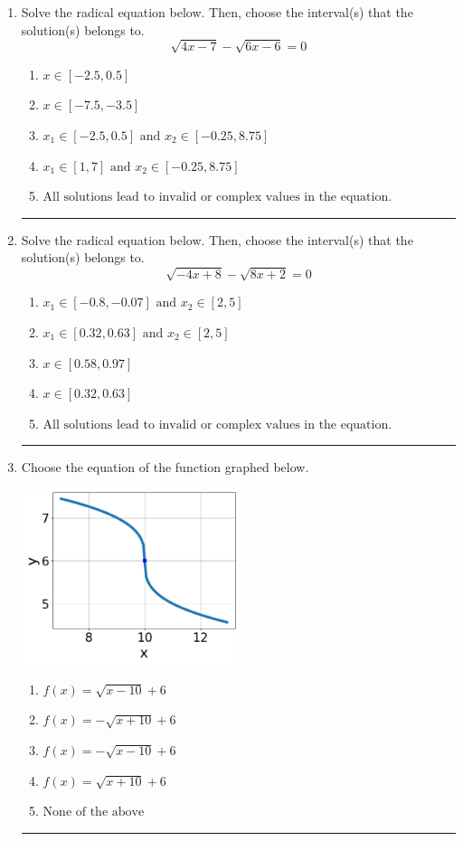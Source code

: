 \documentclass[14pt]{extbook}
\newcommand{\litem}[1]{\item#1\hspace*{-1cm}\rule{\textwidth}{0.4pt}}
\begin{document}
\begin{enumerate}
{\begin{enumerate}[label=\Alph*.]
\end{enumerate} }
\litem{
Solve the radical equation below. Then, choose the interval(s) that the solution(s) belongs to.\[ \sqrt{4 x - 7} - \sqrt{6 x - 6} = 0 \]\begin{enumerate}[label=\Alph*.]
\item \( x \in [-2.5,0.5] \)
\item \( x \in [-7.5,-3.5] \)
\item \( x_1 \in [-2.5, 0.5] \text{ and } x_2 \in [-0.25,8.75] \)
\item \( x_1 \in [1, 7] \text{ and } x_2 \in [-0.25,8.75] \)
\item \( \text{All solutions lead to invalid or complex values in the equation.} \)

\end{enumerate} }
\litem{
Solve the radical equation below. Then, choose the interval(s) that the solution(s) belongs to.\[ \sqrt{-4 x + 8} - \sqrt{8 x + 2} = 0 \]\begin{enumerate}[label=\Alph*.]
\item \( x_1 \in [-0.8, -0.07] \text{ and } x_2 \in [2,5] \)
\item \( x_1 \in [0.32, 0.63] \text{ and } x_2 \in [2,5] \)
\item \( x \in [0.58,0.97] \)
\item \( x \in [0.32,0.63] \)
\item \( \text{All solutions lead to invalid or complex values in the equation.} \)

\end{enumerate} }
\litem{
Choose the equation of the function graphed below.
\begin{center}
    \includegraphics[width=0.5\textwidth]{../Figures/radicalGraphToEquationCopyB.png}
\end{center}
\begin{enumerate}[label=\Alph*.]
\item \( f(x) = \sqrt{x - 10} + 6 \)
\item \( f(x) = - \sqrt{x + 10} + 6 \)
\item \( f(x) = - \sqrt{x - 10} + 6 \)
\item \( f(x) = \sqrt{x + 10} + 6 \)
\item \( \text{None of the above} \)

\end{enumerate} }
\end{enumerate}
\end{document}
